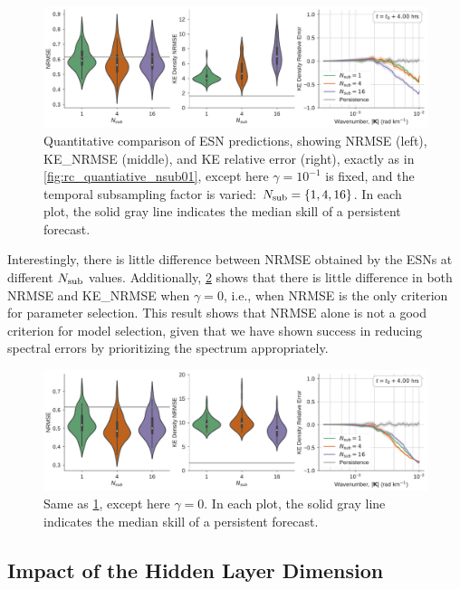 \begin{figure}
    \centering
    \includegraphics[width=\textwidth]{../figures/rc_all_gamma0.1.pdf}
    \caption{Quantitative comparison of ESN predictions, showing
        NRMSE (left), KE\_NRMSE (middle), and KE relative error (right), exactly as in
        \cref{fig:rc_quantiative_nsub01}, except here $\gamma=10^{-1}$ is fixed,
        and the temporal subsampling factor is varied: $N_\text{sub}=\{1,4,16\}$.
        In each plot, the solid gray line indicates the median skill of a persistent
        forecast.
    }
    \label{fig:rc_quantiative_gamma0.1}
\end{figure}

Interestingly, there is little difference between NRMSE obtained by the ESNs at
different $N_\text{sub}$ values.
Additionally, \cref{fig:rc_quantiative_gamma0.0} shows that there is little
difference in both NRMSE and KE\_NRMSE when $\gamma=0$, i.e., when NRMSE is the only criterion
for parameter selection.
This result shows that NRMSE alone is not a good criterion for model selection, given
that we have shown success in reducing spectral errors by prioritizing the spectrum appropriately.

\begin{figure}
    \centering
    \includegraphics[width=\textwidth]{../figures/rc_all_gamma0.0.pdf}
    \caption{Same as \cref{fig:rc_quantiative_gamma0.1}, except here $\gamma=0$.
        In each plot, the solid gray line indicates the median skill of a persistent
        forecast.
    }
    \label{fig:rc_quantiative_gamma0.0}
\end{figure}

\subsection{Impact of the Hidden Layer Dimension}
\label{subsec:esn-size}

